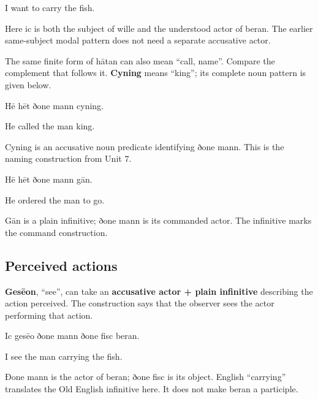 I want to carry the fish.

Here ic is both the subject of wille and the understood actor of beran. The earlier same-subject modal pattern does not need a separate accusative actor.

The same finite form of hātan can also mean “call, name”. Compare the complement that follows it. \textbf{Cyning} means “king”; its complete noun pattern is given below.

Hē hēt ðone mann cyning.

He called the man king.

Cyning is an accusative noun predicate identifying ðone mann. This is the naming construction from Unit 7.

Hē hēt ðone mann gān.

He ordered the man to go.

Gān is a plain infinitive; ðone mann is its commanded actor. The infinitive marks the command construction.

\subsection*{Perceived actions}

\textbf{Gesēon}, “see”, can take an \textbf{accusative actor + plain infinitive} describing the action perceived. The construction says that the observer sees the actor performing that action.

Ic gesēo ðone mann ðone fisc beran.

I see the man carrying the fish.

Ðone mann is the actor of beran; ðone fisc is its object. English “carrying” translates the Old English infinitive here. It does not make beran a participle.

